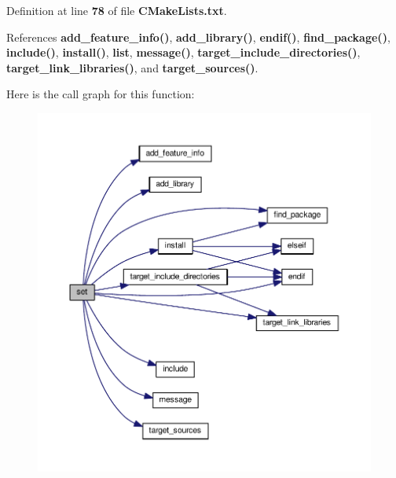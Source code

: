 Definition at line {\bf 78} of file {\bf C\+Make\+Lists.\+txt}.



References {\bf add\+\_\+feature\+\_\+info()}, {\bf add\+\_\+library()}, {\bf endif()}, {\bf find\+\_\+package()}, {\bf include()}, {\bf install()}, {\bf list}, {\bf message()}, {\bf target\+\_\+include\+\_\+directories()}, {\bf target\+\_\+link\+\_\+libraries()}, and {\bf target\+\_\+sources()}.



Here is the call graph for this function\+:
\nopagebreak
\begin{figure}[H]
\begin{center}
\leavevmode
\includegraphics[width=350pt]{d0/dbf/src_2CMakeLists_8txt_ab2c8ff3a733b842948dbd66addba266b_cgraph}
\end{center}
\end{figure}


